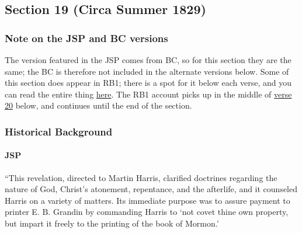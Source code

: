 \subsection{Section 19 (Circa Summer 1829)}
	\label{DC19}
		
	\subsubsection{Note on the JSP and BC versions}
	
		The version featured in the JSP comes from BC, so for this section they are the same; the BC is therefore not included in the alternate versions below. Some of this section does appear in RB1; there is a spot for it below each verse, and you can read the entire thing \hyperref[EXSS-DC19-RB1]{here}. The RB1 account picks up in the middle of \hyperref[DC19-20]{verse 20} below, and continues until the end of the section.
	
	\subsubsection{Historical Background}
		\label{DC19-HB}
		
		\paragraph{JSP}
		
			``This revelation, directed to Martin Harris, clarified doctrines regarding the nature of God, Christ's atonement, repentance, and the afterlife, and it counseled Harris on a variety of matters. Its immediate purpose was to assure payment to printer E. B. Grandin by commanding Harris to `not covet thine own property, but impart it freely to the printing of the book of Mormon.'
			
